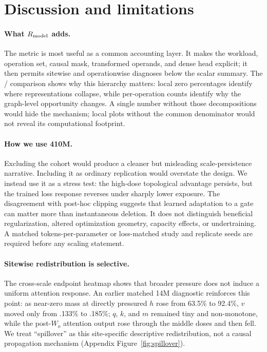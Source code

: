 \section{Discussion and limitations}
\label{sec:discussion}

\paragraph{What $R_{\mathrm{model}}$ adds.}
The metric is most useful as a common accounting layer.  It makes the workload,
operation set, causal mask, transformed operands, and dense head explicit; it
then permits sitewise and operationwise diagnoses below the scalar summary.
The \Afour/\Aseven{} comparison shows why this hierarchy matters: local zero
percentages identify where representations collapse, while per-operation counts
identify why the graph-level opportunity changes.  A single number without
those decompositions would hide the mechanism; local plots without the common
denominator would not reveal its computational footprint.

\paragraph{How we use 410M.}
Excluding the cohort would produce a cleaner but misleading scale-persistence
narrative.  Including it as ordinary replication would overstate the design.
We instead use it as a stress test: the high-dose topological advantage
persists, but the trained loss response reverses under sharply lower exposure.
The disagreement with post-hoc clipping suggests that learned adaptation to a
gate can matter more than instantaneous deletion.  It does not distinguish
beneficial regularization, altered optimization geometry, capacity effects, or
undertraining.  A matched tokens-per-parameter or loss-matched study and
replicate seeds are required before any scaling statement.

\paragraph{Sitewise redistribution is selective.}
The cross-scale endpoint heatmap shows that broader pressure does not induce a
uniform attention response.  An earlier matched 14M diagnostic reinforces this
point: as near-zero mass at directly pressured $h$ rose from 63.5\% to 92.4\%,
$v$ moved only from .133\% to .185\%; $q$, $k$, and $m$ remained tiny and
non-monotone, while the post-$W_o$ attention output rose through the middle
doses and then fell.  We treat ``spillover'' as this site-specific descriptive
redistribution, not a causal propagation mechanism (Appendix
Figure~\ref{fig:spillover}).

